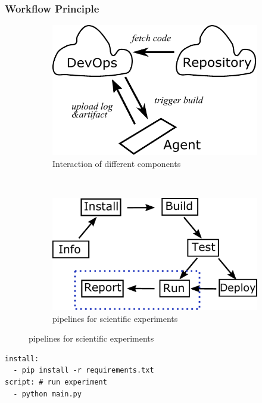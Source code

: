 \documentclass[notheorems]{beamer}
\begin{document}
\begin{frame}[fragile]
\frametitle{Workflow Principle}
\begin{figure}
\centering
\begin{subfigure}{0.4\textwidth}
\includegraphics[width=\textwidth]{../principal.pdf}
\caption{Interaction of different components}
\end{subfigure}~
\begin{subfigure}{0.4\textwidth}
\includegraphics[width=\textwidth]{../workflow.pdf}
\caption{pipelines for scientific experiments}
\end{subfigure}
\end{figure}

\begin{lstlisting}[caption={workflow description}, label={lst:wd}, captionpos=b]
install: 
  - pip install -r requirements.txt
script: # run experiment
  - python main.py
\end{lstlisting}

\end{frame}
\frame{\tableofcontents[currentsection]}
\end{document}
